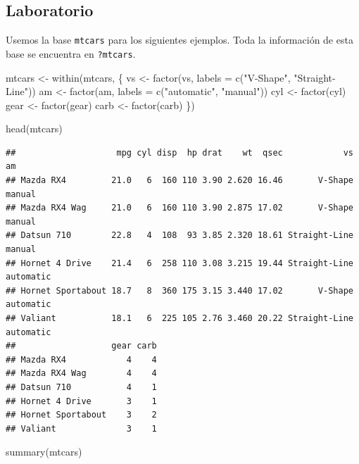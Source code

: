 \documentclass[
  12pt,
]{book}
\newenvironment{Shaded}{\begin{snugshade}}{\end{snugshade}}
\newcommand{\AttributeTok}[1]{\textcolor[rgb]{0.77,0.63,0.00}{#1}}
\newcommand{\FunctionTok}[1]{\textcolor[rgb]{0.00,0.00,0.00}{#1}}
\newcommand{\NormalTok}[1]{#1}
\newcommand{\OtherTok}[1]{\textcolor[rgb]{0.56,0.35,0.01}{#1}}
\newcommand{\StringTok}[1]{\textcolor[rgb]{0.31,0.60,0.02}{#1}}
\theoremstyle{definition}
\theoremstyle{definition}
\theoremstyle{definition}
\theoremstyle{remark}
\begin{document}
\hypertarget{laboratorio-1}{%
\subsection{Laboratorio}\label{laboratorio-1}}

Usemos la base \texttt{mtcars} para los siguientes ejemplos. Toda la información de esta base se encuentra en \texttt{?mtcars}.

\begin{Shaded}
\begin{Highlighting}[]
\NormalTok{mtcars }\OtherTok{\textless{}{-}} \FunctionTok{within}\NormalTok{(mtcars, \{}
\NormalTok{    vs }\OtherTok{\textless{}{-}} \FunctionTok{factor}\NormalTok{(vs, }\AttributeTok{labels =} \FunctionTok{c}\NormalTok{(}\StringTok{"V{-}Shape"}\NormalTok{, }\StringTok{"Straight{-}Line"}\NormalTok{))}
\NormalTok{    am }\OtherTok{\textless{}{-}} \FunctionTok{factor}\NormalTok{(am, }\AttributeTok{labels =} \FunctionTok{c}\NormalTok{(}\StringTok{"automatic"}\NormalTok{, }\StringTok{"manual"}\NormalTok{))}
\NormalTok{    cyl }\OtherTok{\textless{}{-}} \FunctionTok{factor}\NormalTok{(cyl)}
\NormalTok{    gear }\OtherTok{\textless{}{-}} \FunctionTok{factor}\NormalTok{(gear)}
\NormalTok{    carb }\OtherTok{\textless{}{-}} \FunctionTok{factor}\NormalTok{(carb)}
\NormalTok{\})}

\FunctionTok{head}\NormalTok{(mtcars)}
\end{Highlighting}
\end{Shaded}

\begin{verbatim}
##                    mpg cyl disp  hp drat    wt  qsec            vs        am
## Mazda RX4         21.0   6  160 110 3.90 2.620 16.46       V-Shape    manual
## Mazda RX4 Wag     21.0   6  160 110 3.90 2.875 17.02       V-Shape    manual
## Datsun 710        22.8   4  108  93 3.85 2.320 18.61 Straight-Line    manual
## Hornet 4 Drive    21.4   6  258 110 3.08 3.215 19.44 Straight-Line automatic
## Hornet Sportabout 18.7   8  360 175 3.15 3.440 17.02       V-Shape automatic
## Valiant           18.1   6  225 105 2.76 3.460 20.22 Straight-Line automatic
##                   gear carb
## Mazda RX4            4    4
## Mazda RX4 Wag        4    4
## Datsun 710           4    1
## Hornet 4 Drive       3    1
## Hornet Sportabout    3    2
## Valiant              3    1
\end{verbatim}

\begin{Shaded}
\begin{Highlighting}[]
\FunctionTok{summary}\NormalTok{(mtcars)}
\end{Highlighting}
\end{Shaded}
\end{document}
